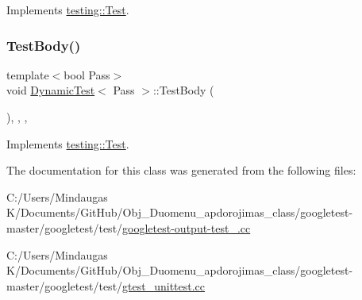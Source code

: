 Implements \mbox{\hyperlink{classtesting_1_1_test_a146a4a5d9854e676d625a0ef67409794}{testing\+::\+Test}}.

\mbox{\label{class_dynamic_test_afc4a0a94673a3d37709f9cd03e82b821}} 
\subsubsection{\texorpdfstring{TestBody()}{TestBody()}\hspace{0.1cm}{\footnotesize\ttfamily [4/4]}}
{\footnotesize\ttfamily template$<$bool Pass$>$ \\
void \mbox{\hyperlink{class_dynamic_test}{Dynamic\+Test}}$<$ Pass $>$\+::Test\+Body (\begin{DoxyParamCaption}{ }\end{DoxyParamCaption})\hspace{0.3cm}{\ttfamily [inline]}, {\ttfamily [override]}, {\ttfamily [private]}, {\ttfamily [virtual]}}



Implements \mbox{\hyperlink{classtesting_1_1_test_a146a4a5d9854e676d625a0ef67409794}{testing\+::\+Test}}.



The documentation for this class was generated from the following files\+:\begin{DoxyCompactItemize}
\item 
C\+:/\+Users/\+Mindaugas K/\+Documents/\+Git\+Hub/\+Obj\+\_\+\+Duomenu\+\_\+apdorojimas\+\_\+class/googletest-\/master/googletest/test/\mbox{\hyperlink{googletest-master_2googletest_2test_2googletest-output-test___8cc}{googletest-\/output-\/test\+\_\+.\+cc}}\item 
C\+:/\+Users/\+Mindaugas K/\+Documents/\+Git\+Hub/\+Obj\+\_\+\+Duomenu\+\_\+apdorojimas\+\_\+class/googletest-\/master/googletest/test/\mbox{\hyperlink{googletest-master_2googletest_2test_2gtest__unittest_8cc}{gtest\+\_\+unittest.\+cc}}\end{DoxyCompactItemize}
